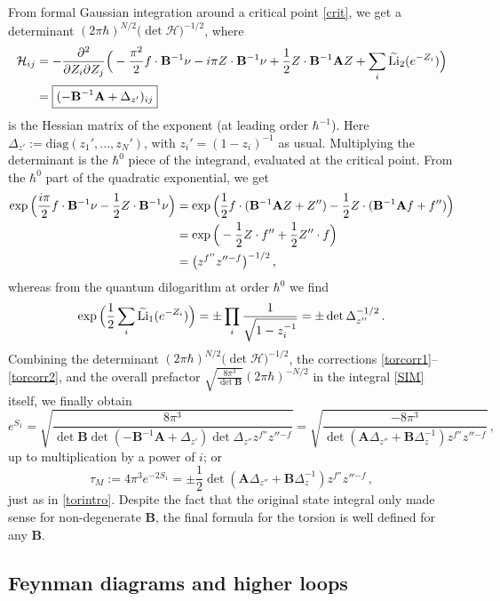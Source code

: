 \documentclass[12pt]{amsart}
\newcommand{\lbl}{\label}
\renewcommand{\eta}{\nu}
\theoremstyle{definition}
\def\be{  \begin{equation} }
\def\ee{  \end{equation} }
\def\diag{\text{diag}}
\newcommand{\CH}{\mathcal{H}}
\newcommand{\Li}{{\rm Li}}
\newcommand{\wt}{\widetilde}
\newcommand{\mb}{\mathbf}
\numberwithin{equation}{section}
\begin{document}
From formal Gaussian integration around a critical point \eqref{crit}, 
we get a determinant $(2\pi \hbar)^{N/2}\big(\det \CH\big)^{-1/2}$, where
%
\begin{align} \CH_{ij} &= -\frac{\partial^2}{\partial Z_i
\partial Z_j}\Big(-\frac{\pi^2}{2}f\cdot \mb B^{-1}\eta-i\pi Z\cdot
\mb B^{-1}\eta+\frac1{2}Z\cdot\mb{B}^{-1}\mb A Z+\sum_i\wt{\Li}_2(e^{-Z_i})\Big) 
\notag \\
 &= \boxed{ (-\mb B^{-1}\mb A+\Delta_{z'})_{ij}} \lbl{Hess}
\end{align}
%
is the Hessian matrix of the exponent (at leading order $\hbar^{-1}$). 
Here $\Delta_{z'}:=\diag(z_1',...,z_N')$, with $z_i'=(1-z_i)^{-1}$ as usual. 
Multiplying the determinant is the $\hbar^0$ piece of the integrand, 
evaluated at the critical point. From the $\hbar^0$ part of the quadratic 
exponential, we get
%
\begin{align} \exp\Big(\frac{i\pi}{2}f\cdot \mb B^{-1}\eta
-\frac12 Z\cdot \mb B^{-1}\eta\Big)
 &= \exp\Big( \frac12 f\cdot (\mb B^{-1}\mb A Z+Z'')
-\frac12 Z\cdot (\mb B^{-1}\mb A f+f'')\Big) \notag \\
 &= \exp\Big(-\frac12 Z\cdot f''+\frac12 Z''\cdot f\Big) \notag \\
 & = \big(z^{f''}z''{}^{-f}\big)^{-1/2}\,, \lbl{torcorr1}
\end{align}
%
whereas from the quantum dilogarithm at order $\hbar^0$ we find
%
\be 
\exp\Big(\frac12\sum_i\wt\Li_1(e^{-Z_i})\Big) 
= \pm\prod_i \frac{1}{\sqrt{1-z_i^{-1}}}=\pm\det \Delta_{z''}^{-1/2}\,. 
\lbl{torcorr2} 
\ee
%
Combining the determinant $(2\pi \hbar)^{N/2}\big(\det \CH\big)^{-1/2}$, 
the corrections \eqref{torcorr1}--\eqref{torcorr2}, and the overall 
prefactor $\sqrt{\frac{8\pi^3}{\det \mb B}}(2\pi\hbar)^{-N/2}$ in the 
integral \eqref{SIM} itself, we finally obtain
%
\be
e^{S_1} = \sqrt{\frac{8\pi^3}{ \det\mb B \det(-\mb B^{-1}\mb A
+\Delta_{z'})\det\Delta_{z''}z^{f''}z''{}^{-f}}} = 
\sqrt{\frac{-8\pi^3}{\det(\mb A\Delta_{z''}
+\mb B\Delta_z^{-1})z^{f''}z''{}^{-f}}}\,, 
\ee
%
up to multiplication by a power of $i$; or
%
\be \tau_M := 4\pi^3e^{-2S_1} = \pm\frac12\det(\mb A\Delta_{z''}
+\mb B\Delta_z^{-1})z^{f''}z''{}^{-f}\,,\ee
%
just as in \eqref{torintro}. Despite the fact that the original 
state integral only made sense for non-degenerate $\mb B$, the final
formula for the torsion is well defined for any $\mb B$.




\subsection{Feynman diagrams and higher loops}
\lbl{sec.diags}
\end{document}
